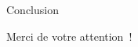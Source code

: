 \documentclass[11pt]{beamer}
\begin{document}
\section*{}

\begin{frame}{Conclusion}
\begin{center}\Huge
Merci de votre attention~!
\end{center}
\end{frame}
\end{document}
